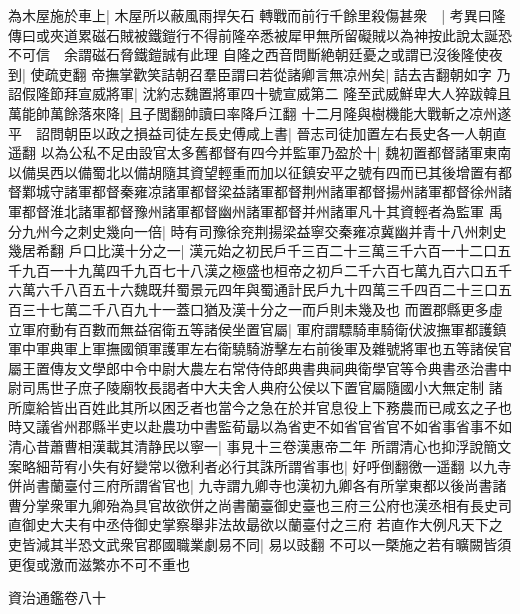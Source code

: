 為木屋施於車上|{
	木屋所以蔽風雨捍矢石}
轉戰而前行千餘里殺傷甚衆　|{
	考異曰隆傳曰或夾道累磁石賊被鐵鎧行不得前隆卒悉被犀甲無所留礙賊以為神按此說太誕恐不可信　余謂磁石脅鐵鎧誠有此理}
自隆之西音問斷絶朝廷憂之或謂已沒後隆使夜到|{
	使疏吏翻}
帝撫掌歡笑詰朝召羣臣謂曰若從諸卿言無凉州矣|{
	詰去吉翻朝如字}
乃詔假隆節拜宣威將軍|{
	沈約志魏置將軍四十號宣威第二}
隆至武威鮮卑大人猝跋韓且萬能帥萬餘落來降|{
	且子閭翻帥讀曰率降戶江翻}
十二月隆與樹機能大戰斬之凉州遂平　詔問朝臣以政之損益司徒左長史傅咸上書|{
	晉志司徒加置左右長史各一人朝直遥翻}
以為公私不足由設官太多舊都督有四今并監軍乃盈於十|{
	魏初置都督諸軍東南以備吳西以備蜀北以備胡隨其資望輕重而加以征鎮安平之號有四而已其後增置有都督鄴城守諸軍都督秦雍凉諸軍都督梁益諸軍都督荆州諸軍都督揚州諸軍都督徐州諸軍都督淮北諸軍都督豫州諸軍都督幽州諸軍都督并州諸軍凡十其資輕者為監軍}
禹分九州今之刺史幾向一倍|{
	時有司豫徐兖荆揚梁益寧交秦雍凉冀幽并青十八州刺史幾居希翻}
戶口比漢十分之一|{
	漢元始之初民戶千三百二十三萬三千六百一十二口五千九百一十九萬四千九百七十八漢之極盛也桓帝之初戶二千六百七萬九百六口五千六萬六千八百五十六魏既幷蜀景元四年與蜀通計民戶九十四萬三千四百二十三口五百三十七萬二千八百九十一蓋口猶及漢十分之一而戶則未幾及也}
而置郡縣更多虛立軍府動有百數而無益宿衛五等諸侯坐置官屬|{
	軍府謂驃騎車騎衛伏波撫軍都護鎮軍中軍典軍上軍撫國領軍護軍左右衛驍騎游擊左右前後軍及雜號將軍也五等諸侯官屬王置傳友文學郎中令中尉大農左右常侍侍郎典書典祠典衛學官等令典書丞治書中尉司馬世子庶子陵廟牧長謁者中大夫舍人典府公侯以下置官屬隨國小大無定制}
諸所廩給皆出百姓此其所以困乏者也當今之急在於并官息役上下務農而已咸玄之子也時又議省州郡縣半吏以赴農功中書監荀朂以為省吏不如省官省官不如省事省事不如清心昔蕭曹相漢載其清静民以寧一|{
	事見十三卷漢惠帝二年}
所謂清心也抑浮說簡文案略細苛宥小失有好變常以徼利者必行其誅所謂省事也|{
	好呼倒翻徼一遥翻}
以九寺併尚書蘭臺付三府所謂省官也|{
	九寺謂九卿寺也漢初九卿各有所掌東都以後尚書諸曹分掌衆軍九卿殆為具官故欲併之尚書蘭臺御史臺也三府三公府也漢丞相有長史司直御史大夫有中丞侍御史掌察舉非法故朂欲以蘭臺付之三府}
若直作大例凡天下之吏皆減其半恐文武衆官郡國職業劇易不同|{
	易以豉翻}
不可以一槩施之若有曠闕皆須更復或激而滋繁亦不可不重也

資治通鑑卷八十
